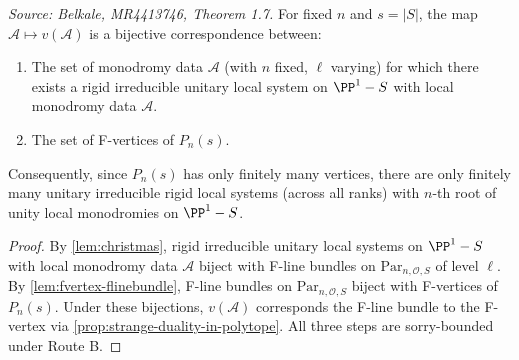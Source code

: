 \begin{theorem}[Egregium]
  \label{thm:egregium}
  \textit{Source: Belkale, MR4413746, Theorem 1.7.}
  For fixed \(n\) and \(s = |S|\), the map \(\mathcal{A} \mapsto v(\mathcal{A})\) is a bijective correspondence between:
  \begin{enumerate}
    \item The set of monodromy data \(\mathcal{A}\) (with \(n\) fixed, \(\ell\) varying) for which there exists a rigid irreducible unitary local system on \(\PP^1 - S\) with local monodromy data \(\mathcal{A}\).
    \item The set of F-vertices of \(P_n(s)\).
  \end{enumerate}
  Consequently, since \(P_n(s)\) has only finitely many vertices, there are only finitely many unitary irreducible rigid local systems (across all ranks) with \(n\)-th root of unity local monodromies on \(\PP^1 - S\).
\end{theorem}

\begin{proof}
  By \cref{lem:christmas}, rigid irreducible unitary local systems on \(\PP^1 - S\) with local monodromy data \(\mathcal{A}\) biject with F-line bundles on \(\mathrm{Par}_{n,\mathcal{O},S}\) of level \(\ell\). By \cref{lem:fvertex-flinebundle}, F-line bundles on \(\mathrm{Par}_{n,\mathcal{O},S}\) biject with F-vertices of \(P_n(s)\). Under these bijections, \(v(\mathcal{A})\) corresponds the F-line bundle to the F-vertex via \cref{prop:strange-duality-in-polytope}. All three steps are sorry-bounded under Route B.
\end{proof}

